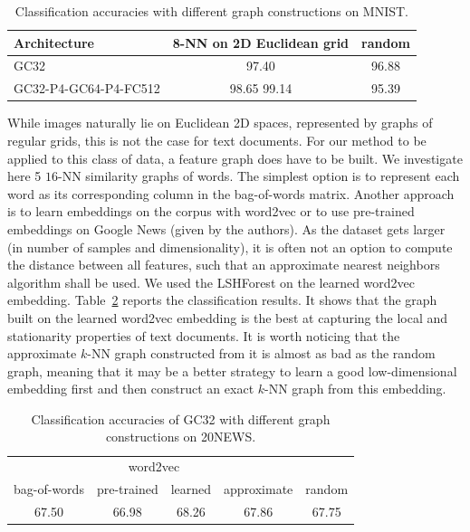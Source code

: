 \documentclass{article}
\newcommand{\tabref}[1]{Table~\ref{tab:#1}}
\newcommand{\todo}[1]{{\color{red} #1 }}
\begin{document}



\begin{table}[h!]
\centering
\begin{tabular}{lcc} \toprule
Architecture & 8-NN on 2D Euclidean grid & random \\
\midrule
GC32 & 97.40 & 96.88 \\
GC32-P4-GC64-P4-FC512 & 98.65\todo{99.14} & 95.39 \\
\bottomrule \end{tabular}
\caption{Classification accuracies with different graph constructions on MNIST.} 
\label{tab:mnist_quality}
\end{table}



While images naturally lie on Euclidean 2D spaces, represented by graphs of regular grids, this is not the case for
text documents. For our method to be applied to this class of data, a feature graph does have to be built.
We investigate here 5 $16$-NN similarity graphs of words. The simplest option is
to represent each word as its corresponding column in the bag-of-words matrix.
Another approach is to learn embeddings on the corpus with word2vec
\cite{pro:MikolovChenCorradoDean13word2vec} or to use pre-trained embeddings on
Google News (given by the authors). As the dataset gets larger (in number of
samples and dimensionality), it is often not an option to compute the distance
between all features, such that an approximate nearest neighbors algorithm shall
be used. We used the LSHForest \cite{pro:BawaCondieGanesan05LSHForest} on the
learned word2vec embedding. \tabref{20news_quality} reports the classification
results. It shows that the graph built on the learned word2vec embedding is the
best at capturing the local and stationarity properties of text documents. It is
worth noticing that the approximate $k$-NN graph constructed from it is almost
as bad as the random graph, meaning that it may be a better strategy to learn a
good low-dimensional embedding first and then construct an exact $k$-NN graph
from this embedding.

\begin{table}[h!] \centering
\begin{tabular}{ccccc} \toprule
& \multicolumn{2}{c}{word2vec} & & \\
bag-of-words & pre-trained & learned & approximate & random \\
\midrule
67.50 & \todo{66.98} & 68.26 & 67.86 & 67.75 \\
\bottomrule \end{tabular}
\caption{Classification accuracies of GC32 with different graph constructions on 20NEWS.} 
\label{tab4b}
\label{tab:20news_quality}
\end{table}
\end{document}
